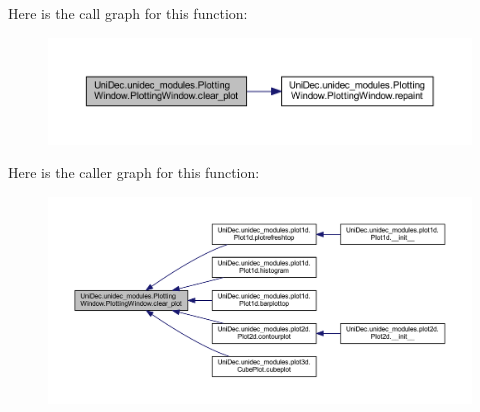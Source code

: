 Here is the call graph for this function\+:\nopagebreak
\begin{figure}[H]
\begin{center}
\leavevmode
\includegraphics[width=350pt]{class_uni_dec_1_1unidec__modules_1_1_plotting_window_1_1_plotting_window_a0bb4e4db8b8c443eceba5f4396517885_cgraph}
\end{center}
\end{figure}




Here is the caller graph for this function\+:\nopagebreak
\begin{figure}[H]
\begin{center}
\leavevmode
\includegraphics[width=350pt]{class_uni_dec_1_1unidec__modules_1_1_plotting_window_1_1_plotting_window_a0bb4e4db8b8c443eceba5f4396517885_icgraph}
\end{center}
\end{figure}


\hypertarget{class_uni_dec_1_1unidec__modules_1_1_plotting_window_1_1_plotting_window_a2571bb41ad9653cb55b15b9526a524a8}{}
